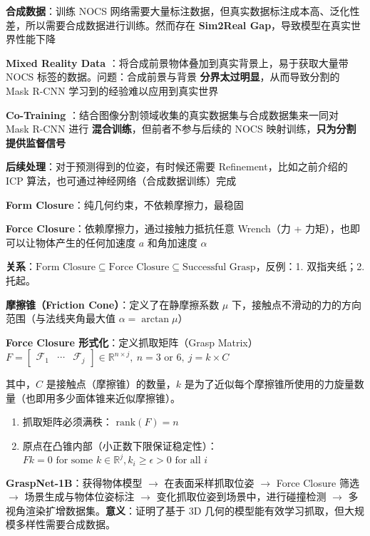 \documentclass[
  8pt]{extarticle}
\providecommand{\tightlist}{%
  \setlength{\itemsep}{0pt}\setlength{\parskip}{0pt}}
\begin{document}
\begin{multicols*}{4}
\textbf{合成数据}：训练 NOCS
网络需要大量标注数据，但真实数据标注成本高、泛化性差，所以需要合成数据进行训练。然而存在
\textbf{Sim2Real Gap}，导致模型在真实世界性能下降

\textbf{Mixed Reality Data}
：将合成前景物体叠加到真实背景上，易于获取大量带 NOCS
标签的数据。问题：合成前景与背景 \textbf{分界太过明显}，从而导致分割的
Mask R-CNN 学习到的经验难以应用到真实世界

\textbf{Co-Training}
：结合图像分割领域收集的真实数据集与合成数据集来一同对 Mask R-CNN 进行
\textbf{混合训练}，但前者不参与后续的 NOCS
映射训练，\textbf{只为分割提供监督信号}

\textbf{后续处理}：对于预测得到的位姿，有时候还需要
Refinement，比如之前介绍的 ICP
算法，也可通过神经网络（合成数据训练）完成

\textbf{Form Closure}：纯几何约束，不依赖摩擦力，最稳固

\textbf{Force Closure}：依赖摩擦力，通过接触力抵抗任意 Wrench（力 +
力矩），也即可以让物体产生的任何加速度 \(a\) 和角加速度 \(\alpha\)

\textbf{关系}：\(\text{Form Closure} \subseteq \text{Force Closure} \subseteq \text{Successful Grasp}\)，反例：1.
双指夹纸；2. 托起。

\textbf{摩擦锥（Friction Cone）}：定义了在静摩擦系数 \(\mu\)
下，接触点不滑动的力的方向范围（与法线夹角最大值
\(\alpha = \arctan \mu\)）

\textbf{Force Closure 形式化}：定义抓取矩阵（Grasp
Matrix）\(F = \begin{bmatrix} \mathcal{F}_1 & \cdots & \mathcal{F}_j \end{bmatrix} \in \mathbb{R}^{n \times j},\ n = 3 \text{ or } 6,\ j = k \times C\)

其中，\(C\) 是接触点（摩擦锥）的数量，\(k\)
是为了近似每个摩擦锥所使用的力旋量数量（也即用多少面体锥来近似摩擦锥）。

\begin{enumerate}
\def\labelenumi{\arabic{enumi}.}
\tightlist
\item
  抓取矩阵必须满秩： \(\text{rank}(F)=n\)
\item
  原点在凸锥内部（小正数下限保证稳定性）：\(Fk = 0 \text{ for some } k \in \mathbb{R}^j, k_i \ge \epsilon > 0 \text{ for all } i\)
\end{enumerate}

\textbf{GraspNet-1B}：获得物体模型 \(\to\) 在表面采样抓取位姿 \(\to\)
Force Closure 筛选 \(\to\) 场景生成与物体位姿标注 \(\to\)
变化抓取位姿到场景中，进行碰撞检测 \(\to\)
多视角渲染扩增数据集。\textbf{意义}：证明了基于 3D
几何的模型能有效学习抓取，但大规模多样性需要合成数据。


\end{multicols*}
\end{document}
